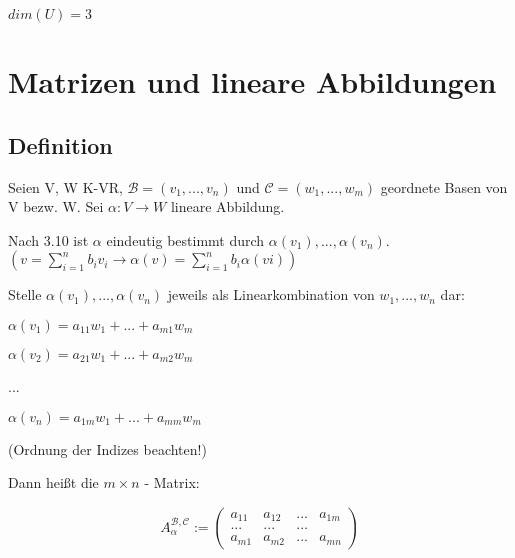 \documentclass[a4paper, openany]{book}
\begin{document}
        $dim(U) = 3$

        \chapter{Matrizen und lineare Abbildungen}

        \section{Definition}

        Seien V, W K-VR, $\mathcal{B} = (v_1, ..., v_n)$ und $\mathcal{C} = (w_1, ..., w_m)$ geordnete Basen von V bezw. W. Sei $\alpha : V \rightarrow W$ lineare Abbildung.

        \par \medskip

        Nach 3.10 ist $\alpha$ eindeutig bestimmt durch $\alpha(v_1), ..., \alpha(v_n)$. $(v = \sum_{i=1}^n b_i v_i \rightarrow \alpha(v) = \sum_{i=1}^n b_i \alpha(vi))$

        \par \medskip

        \par \medskip

        Stelle $\alpha(v_1), ..., \alpha(v_n)$ jeweils als Linearkombination von $w_1, ..., w_n$ dar:

        \begin{center}
          $\alpha(v_1) = a_{11}w_{1} + ... + a_{m1}w_m$

          $\alpha(v_2) = a_{21}w_{1} + ... + a_{m2} w_m$

          ...

          $\alpha(v_n) = a_{1m}w_{1} + ... + a_{mm} w_m$
        \end{center}

        (Ordnung der Indizes beachten!)

        \par \medskip

        Dann heißt die $m \times n$ - Matrix:

        \begin{equation}
          A_{\alpha}^{\mathcal{B, C}} := \begin{pmatrix}a_{11} & a_{12} & ... & a_{1m} \\ ... & ... & ... \\ a_{m1} & a_{m2} & ... & a_{mn} \end{pmatrix}
        \end{equation}
\end{document}
